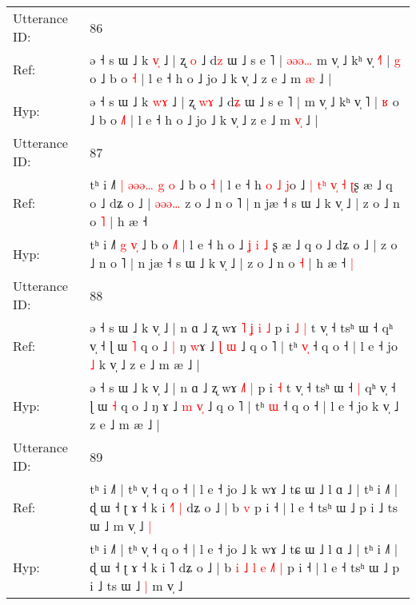 \documentclass[10pt]{article}
\DeclareRobustCommand{\hl}[1]{{\textcolor{red}{#1}}}
\begin{document}
\begin{longtable}{ll}
Utterance ID: & 86 \\
Ref: & ə ˧ s ɯ ˩ k \hl{v}\hl{̩} ˩ | ʐ \hl{}\hl{o} ˩ d\hl{z} ɯ ˩ s e ˥ |\hl{ }\hl{ə}\hl{ə}\hl{ə}\hl{…} m v̩ ˩ kʰ v̩ \hl{˧}˥ | \hl{g} o ˩ b o \hl{}\hl{˧} | l e ˧ h o ˩ jo ˩ k v̩ ˩ z e ˩ m \hl{}\hl{æ} ˩ |
 \\
Hyp: & ə ˧ s ɯ ˩ k \hl{w}\hl{ɤ} ˩ | ʐ \hl{w}\hl{ɤ} ˩ d\hl{ʑ} ɯ ˩ s e ˥ |\hl{}\hl{}\hl{}\hl{}\hl{} m v̩ ˩ kʰ v̩ \hl{}˥ | \hl{ʁ} o ˩ b o \hl{˩}\hl{˥} | l e ˧ h o ˩ jo ˩ k v̩ ˩ z e ˩ m \hl{v}\hl{̩} ˩ |
 \\
\midrule
Utterance ID: & 87 \\
Ref: & tʰ i ˩˥\hl{ }\hl{|} \hl{ə}\hl{ə}\hl{ə}\hl{…} \hl{g}\hl{ }\hl{o} ˩ b o \hl{}\hl{˧} | l e ˧ h\hl{ }\hl{o}\hl{ }\hl{˩} \hl{j}o ˩\hl{ }\hl{|} \hl{t}\hl{ʰ} \hl{v}\hl{̩} \hl{˧} \hl{ʈ}ʂ æ ˩ q o ˩ dʑ o ˩ |\hl{ }\hl{ə}\hl{ə}\hl{ə}\hl{…} z o ˩ n o ˥ | n jæ ˧ s ɯ ˩ k v̩ ˩ | z o ˩ n o \hl{˥} | h æ ˧\hl{}\hl{}
 \\
Hyp: & tʰ i ˩˥\hl{}\hl{} \hl{}\hl{}\hl{}\hl{g} \hl{}\hl{v}\hl{̩} ˩ b o \hl{˩}\hl{˥} | l e ˧ h\hl{}\hl{}\hl{}\hl{} \hl{}o ˩\hl{}\hl{} \hl{}\hl{ʝ} \hl{}\hl{i} \hl{˩} \hl{}ʂ æ ˩ q o ˩ dʑ o ˩ |\hl{}\hl{}\hl{}\hl{}\hl{} z o ˩ n o ˥ | n jæ ˧ s ɯ ˩ k v̩ ˩ | z o ˩ n o \hl{˧} | h æ ˧\hl{ }\hl{|}
 \\
\midrule
Utterance ID: & 88 \\
Ref: & ə ˧ s ɯ ˩ k v̩ ˩ | n ɑ ˩ ʐ wɤ\hl{ }\hl{˥} \hl{ʝ}\hl{ }\hl{i} \hl{˩} p i\hl{ }\hl{˩} \hl{|} t v̩ ˧ tsʰ ɯ ˧\hl{}\hl{} qʰ v̩ ˧ ɭ ɯ \hl{˥} q o ˩\hl{ }\hl{|} ŋ \hl{w}ɤ ˩ \hl{ɭ} \hl{}\hl{ɯ} ˩ q o ˥ | tʰ \hl{v}\hl{̩} ˧ q o ˧ | l e ˧ jo\hl{ }\hl{˩} k v̩ ˩ z e ˩ m æ ˩ |
 \\
Hyp: & ə ˧ s ɯ ˩ k v̩ ˩ | n ɑ ˩ ʐ wɤ\hl{}\hl{} \hl{}\hl{˩}\hl{˥} \hl{|} p i\hl{}\hl{} \hl{˧} t v̩ ˧ tsʰ ɯ ˧\hl{ }\hl{|} qʰ v̩ ˧ ɭ ɯ \hl{˧} q o ˩\hl{}\hl{} ŋ \hl{}ɤ ˩ \hl{m} \hl{v}\hl{̩} ˩ q o ˥ | tʰ \hl{}\hl{ɯ} ˧ q o ˧ | l e ˧ jo\hl{}\hl{} k v̩ ˩ z e ˩ m æ ˩ |
 \\
\midrule
Utterance ID: & 89 \\
Ref: & tʰ i ˩˥ | tʰ v̩ ˧ q o ˧ | l e ˧ jo ˩ k wɤ ˩ tɕ ɯ ˩ l ɑ ˩ | tʰ i ˩˥ | ɖ ɯ ˧ ʈ ɤ ˧ k i \hl{˧}˥\hl{ }\hl{|} dʑ o ˩ | b\hl{}\hl{}\hl{}\hl{}\hl{}\hl{}\hl{}\hl{}\hl{}\hl{}\hl{} \hl{v} p i ˧ | l e ˧ tsʰ ɯ ˩ p i ˩ ts ɯ ˩\hl{}\hl{} m v̩ ˩\hl{ }\hl{|}
 \\
Hyp: & tʰ i ˩˥ | tʰ v̩ ˧ q o ˧ | l e ˧ jo ˩ k wɤ ˩ tɕ ɯ ˩ l ɑ ˩ | tʰ i ˩˥ | ɖ ɯ ˧ ʈ ɤ ˧ k i \hl{}˥\hl{}\hl{} dʑ o ˩ | b\hl{ }\hl{i}\hl{ }\hl{˩}\hl{ }\hl{l}\hl{ }\hl{e}\hl{ }\hl{˩}\hl{˥} \hl{|} p i ˧ | l e ˧ tsʰ ɯ ˩ p i ˩ ts ɯ ˩\hl{ }\hl{|} m v̩ ˩\hl{}\hl{}

\end{longtable}
\end{document}
